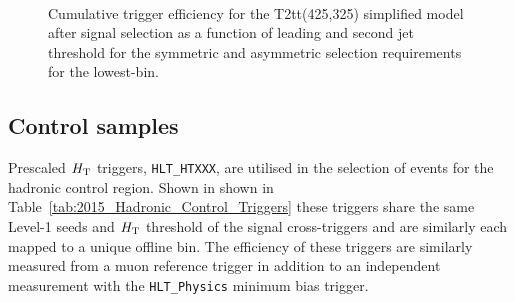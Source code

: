 \begin{figure}[h!]
  \begin{center}
     ~~
     \\
    \caption{
Cumulative trigger efficiency for the T2tt(425,325) simplified model after signal selection as a function of leading and second jet threshold for the symmetric and asymmetric selection requirements for the lowest-\scalht bin.}
    \label{fig:T1ttt_Trigger_Efficiency_DijetAve}
  \end{center} 
\end{figure}





\subsection{Control samples\label{sec:control_samples}}
Prescaled $\mbox{$H_\text{T}$}$ triggers, \verb!HLT_HTXXX!, are utilised in the selection of events for the hadronic control region. Shown in shown in Table~\ref{tab:2015_Hadronic_Control_Triggers} these triggers share the same Level-1 seeds and $\mbox{$H_\text{T}$}$ threshold of the signal cross-triggers and are similarly each mapped to a unique offline bin. The efficiency of these triggers are similarly measured from a muon reference trigger in addition to an independent measurement with the \verb!HLT_Physics! minimum bias trigger.


